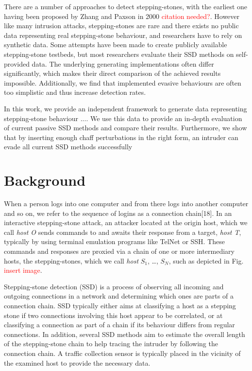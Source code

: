 \documentclass[runningheads]{llncs}\usepackage[]{graphicx}\usepackage[]{color}
\begin{document}
There are a number of approaches to detect stepping-stones, with the earliest one having been proposed by Zhang and Paxson in 2000 \textcolor{red}{citation needed?}. However like many intrusion attacks, stepping-stones are rare and there exists no public data representing real stepping-stone behaviour, and researchers have to rely on synthetic data. Some attempts have been made to create publicly available stepping-stone testbeds, but most researchers evaluate their SSD methods on self-provided data. The underlying generating implementations often differ significantly, which makes their direct comparison of the achieved results impossible. Additionally, we find that implemented evasive behaviours are often too simplistic and thus increase detection rates. 

In this work, we provide an independent framework to generate data representing stepping-stone behaviour ....
We use this data to provide an in-depth evaluation of current passive SSD methods and compare their results. Furthermore, we show that by inserting enough chaff perturbations in the right form, an intruder can evade all current SSD methods successfully


\section{Background}

When a person logs into one computer and from there logs into another computer and so on, we refer to the sequence of logins as a connection chain[18]. 
In an interactive stepping-stone attack, an attacker located at the origin host, which we call \textit{host O} sends commands to and awaits their response from a target, \textit{host T}, typically by using terminal emulation programs like TelNet or SSH. These commands and responses are proxied via a chain of one or more intermediary hosts, the stepping-stones, which we call \textit{host} $S_1$, \dots, $S_N$, such as depicted in Fig. \textcolor{red}{insert image}. 

Stepping-stone detection (SSD) is a process of observing all incoming and outgoing connections in a network and determining which ones are parts of a connection chain. %
SSD typically either aims at classifying a host as a stepping stone if two connections involving this host appear to be correlated, or at classifying a connection as part of a chain if its behaviour differs from regular connections. In addition, several SSD methods aim to estimate the overall length of the stepping-stone chain to help tracing the intruder by following the connection chain. 
A traffic collection sensor is typically placed in the vicinity of the examined host to provide the necessary data. 
\end{document}
